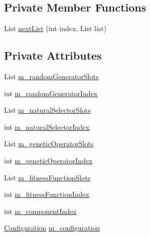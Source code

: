 \subsection*{Private Member Functions}
\begin{DoxyCompactItemize}
\item 
List \hyperlink{classorg_1_1jgap_1_1audit_1_1_permuting_configuration_a34e41f46c39d3b52dd7b2b1b20e1dcf0}{next\-List} (int index, List list)
\end{DoxyCompactItemize}
\subsection*{Private Attributes}
\begin{DoxyCompactItemize}
\item 
List \hyperlink{classorg_1_1jgap_1_1audit_1_1_permuting_configuration_af872b4a0ca5e224f9cd5df0562ff4a24}{m\-\_\-random\-Generator\-Slots}
\item 
int \hyperlink{classorg_1_1jgap_1_1audit_1_1_permuting_configuration_aec769b8be74c5a9b0345772af2681bb2}{m\-\_\-random\-Generator\-Index}
\item 
List \hyperlink{classorg_1_1jgap_1_1audit_1_1_permuting_configuration_a4f35e5a811a4dcccf937933ed92aaa4d}{m\-\_\-natural\-Selector\-Slots}
\item 
int \hyperlink{classorg_1_1jgap_1_1audit_1_1_permuting_configuration_acb728454c8352af48836c9ee42a0f7d0}{m\-\_\-natural\-Selector\-Index}
\item 
List \hyperlink{classorg_1_1jgap_1_1audit_1_1_permuting_configuration_a7d59d322afaeac139573df83f7e420d4}{m\-\_\-genetic\-Operator\-Slots}
\item 
int \hyperlink{classorg_1_1jgap_1_1audit_1_1_permuting_configuration_ac2d9386cc2e49d33b8dcd315c3cd4788}{m\-\_\-genetic\-Operator\-Index}
\item 
List \hyperlink{classorg_1_1jgap_1_1audit_1_1_permuting_configuration_afa0d7029208eb38eed5d952fa2ddc360}{m\-\_\-fitness\-Function\-Slots}
\item 
int \hyperlink{classorg_1_1jgap_1_1audit_1_1_permuting_configuration_ac9fea85f06f477393df26b75cdbd6534}{m\-\_\-fitness\-Function\-Index}
\item 
int \hyperlink{classorg_1_1jgap_1_1audit_1_1_permuting_configuration_a5cc8b908276404490a52d4da2a9a23fd}{m\-\_\-component\-Index}
\item 
\hyperlink{classorg_1_1jgap_1_1_configuration}{Configuration} \hyperlink{classorg_1_1jgap_1_1audit_1_1_permuting_configuration_a4834069c0160d4173a8f51ced97bf755}{m\-\_\-configuration}
\end{DoxyCompactItemize}
